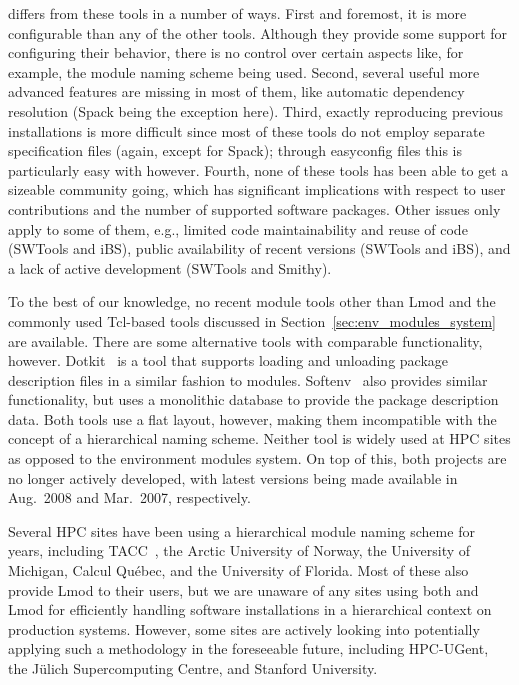\easybuild{} differs from these tools in a number of ways. First and foremost, it is
more configurable than any of the other tools. Although they provide some support
for configuring their behavior, there is no control over certain aspects like, for example, the
module naming scheme being used. Second, several useful more advanced
features are missing in most of them, like automatic dependency resolution (Spack
being the exception here). Third, exactly reproducing previous installations is more
difficult since most of these tools do not employ separate specification files (again,
except for Spack); through easyconfig files this is particularly easy with \easybuild{} however.
Fourth, none of these tools has been able to get a sizeable community going, which
has significant implications with respect to user contributions and the number of supported
software packages.
Other issues only apply to some of them, e.g., limited code
maintainability and reuse of code (SWTools and iBS), public availability of recent
versions (SWTools and iBS), and a lack of active development (SWTools and Smithy).

To the best of our knowledge, no recent module tools other than Lmod and the commonly
used Tcl-based tools discussed in Section~\ref{sec:env_modules_system} are
available. There are some alternative tools with comparable functionality, however.
Dotkit~\cite{dotkit} is a tool that supports loading and unloading package description 
files in a similar fashion to modules. Softenv~\cite{softenv} also provides similar
functionality, but uses a monolithic database to provide the package description data.
Both tools use a flat layout, however, making them incompatible with the concept of a
hierarchical naming scheme. Neither tool is widely used at HPC sites as
opposed to the environment modules system. On top of this, both projects are no longer
actively developed, with latest versions being made available in Aug.~2008 and
Mar.~2007, respectively.

Several HPC sites have been using a hierarchical module naming scheme for years,
including TACC~\cite{lmodSC11}, the Arctic University of Norway, the University
of Michigan, Calcul Qu\'ebec, and the University of Florida. Most of these also provide
Lmod to their users, but we are unaware of any sites using both \easybuild{} and Lmod
for efficiently handling software installations in a hierarchical context on
production systems. However, some
sites are actively looking into potentially applying such a methodology in the
foreseeable future, including HPC-UGent, the J\"ulich Supercomputing Centre, and
Stanford University.
